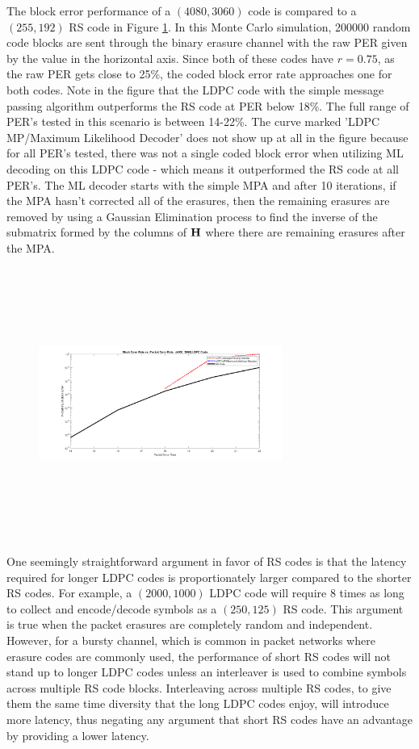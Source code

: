 \documentclass[conference]{IEEEtran}
\begin{document}
The block error performance of a $(4080, 3060)$ code is compared to a $(255, 192)$ RS code in Figure \ref{fig:LDPC_triangular_4080_3060_Perf_vs_RS}.  In this Monte Carlo simulation, 200000 random code blocks are sent through the binary erasure channel with the raw PER given by the value in the horizontal axis.  Since both of these codes have $r = 0.75$, as the raw PER gets close to 25\%, the coded block error rate approaches one for both codes.  Note in the figure that the LDPC code with the simple message passing algorithm outperforms the RS code at PER below 18\%.  The full range of PER's tested in this scenario is between 14-22\%.  The curve marked 'LDPC MP/Maximum Likelihood Decoder' does not show up at all in the figure because for all PER's tested, there was not a single coded block error when utilizing ML decoding on this LDPC code - which means it outperformed the RS code at all PER's.  The ML decoder starts with the simple MPA and after 10 iterations, if the MPA hasn't corrected all of the erasures, then the remaining erasures are removed by using a Gaussian Elimination process to find the inverse of the submatrix formed by the columns of $\bf{H}$ where there are remaining erasures after the MPA.


\begin{figure}[htbp]
	\centerline{\includegraphics[height=3.5in, width = 3.15in]{LDPC_triangular_4080_3060_Perf_vs_RS.png}}
	\caption{}
	\label{fig:LDPC_triangular_4080_3060_Perf_vs_RS}
\end{figure}

One seemingly straightforward argument in favor of RS codes is that the latency required for longer LDPC codes is proportionately larger compared to the shorter RS codes.  For example, a $(2000, 1000)$ LDPC code will require 8 times as long to collect and encode/decode symbols as a $(250, 125)$ RS code.  This argument is true when the packet erasures are completely random and independent.  However, for a bursty channel, which is common in packet networks where erasure codes are commonly used, the performance of short RS codes will not stand up to longer LDPC codes unless an interleaver is used to combine symbols across multiple RS code blocks.  Interleaving across multiple RS codes, to give them the same time diversity that the long LDPC codes enjoy, will introduce more latency, thus negating any argument that short RS codes have an advantage by providing a lower latency.
\end{document}
